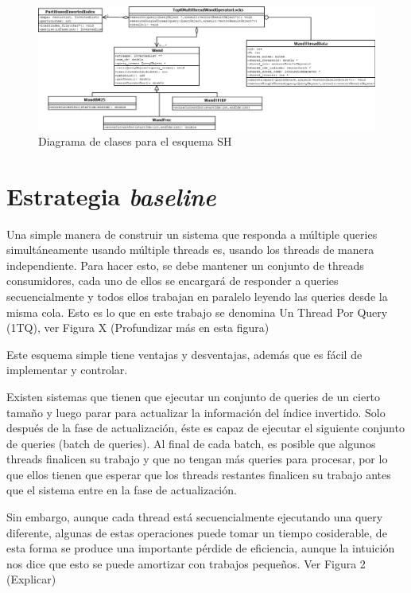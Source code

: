 \begin{list}{}{}
\begin{figure}[H]
\centering
\includegraphics[scale=.75]{images/TopKMultiThreadWandOperatorLocks.png}
\caption{Diagrama de clases para el esquema SH}
\label{fig:TopKMultiThreadWandOperatorLocks}
\end{figure}






\section{Estrategia \textit{baseline}}
\label{scheduling:baseline}
Una simple manera de construir un sistema que responda a múltiple queries simultáneamente usando múltiple threads es, usando los threads de manera independiente. Para hacer esto, se debe mantener un conjunto de threads consumidores, cada uno de ellos se encargará de responder a queries secuencialmente y todos ellos trabajan en paralelo leyendo las queries desde la misma cola. Esto es lo que en este trabajo se denomina Un Thread Por Query (1TQ), ver Figura X (Profundizar más en esta figura)

Este esquema simple tiene ventajas y desventajas, además que es fácil de implementar y controlar. 

Existen sistemas que tienen que ejecutar un conjunto de queries de un cierto tamaño y luego parar para actualizar la información del índice invertido. Solo después de la fase de actualización, éste es capaz de ejecutar el siguiente conjunto de queries (batch de queries). Al final de cada batch, es posible que algunos threads finalicen su trabajo y que no tengan más queries para procesar, por lo que ellos tienen que esperar que los threads restantes finalicen su trabajo antes que el sistema entre en la fase de actualización. 

Sin embargo, aunque cada thread está secuencialmente ejecutando una query diferente, algunas de estas operaciones puede tomar un tiempo cosiderable, de esta forma se produce una importante pérdide de eficiencia, aunque la intuición nos dice que esto se puede amortizar con trabajos pequeños. Ver Figura 2 (Explicar)





\end{list}
